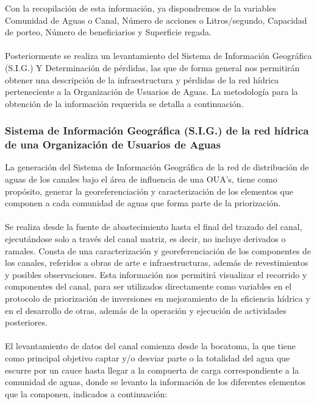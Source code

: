 \documentclass[]{article}
\begin{document}
Con la recopilación de esta información, ya dispondremos de la variables Comunidad de Aguas o Canal, Número de acciones o Litros/segundo, Capacidad de porteo, Número de beneficiarios y Superficie regada.\\
\\
Posteriormente se realiza un levantamiento del Sistema de Información Geográfica (S.I.G.) Y Determinación de pérdidas, las que de forma general nos permitirán obtener una descripción de la infraestructura y pérdidas de la red hídrica perteneciente a la Organización de Usuarios de Aguas. La metodología para la obtención de la información requerida se detalla a continuación.

\subsubsection{Sistema de Información Geográfica (S.I.G.) de la red hídrica de una Organización de Usuarios de Aguas}

La generación del Sistema de Información Geográfica de la red de distribución de aguas de los canales bajo el área de influencia de una OUA's, tiene como propósito, generar la georeferenciación y caracterización de los elementos que componen a cada comunidad de aguas que forma parte de la priorización.\\
\\
Se realiza desde la fuente de abastecimiento hasta el final del trazado del canal, ejecutándose solo a través del canal matriz, es decir, no incluye derivados o ramales. Consta de una caracterización y georeferenciación de los componentes de los canales, referidos a obras de arte e infraestructuras, además de revestimientos y posibles observaciones. Esta información nos permitirá visualizar el recorrido y componentes del canal, para ser utilizados directamente como variables en el protocolo de priorización de inversiones en mejoramiento de la eficiencia hídrica y en el desarrollo de otras, además de la operación y ejecución de actividades posteriores.\\
\\
El levantamiento de datos del canal comienza desde la bocatoma, la que tiene como principal objetivo captar y/o desviar parte o la totalidad del agua que escurre por un cauce hasta llegar a la compuerta de carga correspondiente a la comunidad de aguas, donde se levanto la información de los diferentes elementos que la componen, indicados a continuación:
\end{document}
